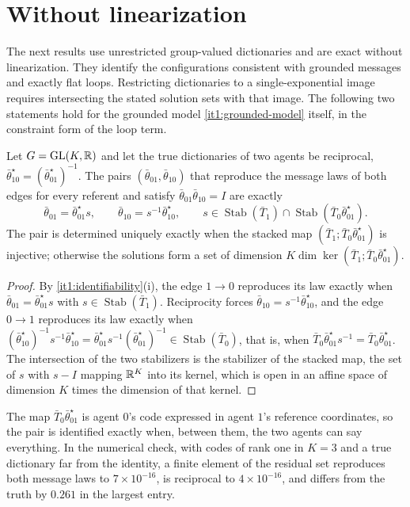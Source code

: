 \documentclass[11pt,letterpaper]{report}
\newcommand{\Stab}{\operatorname{Stab}}
\begin{document}
\section{Without linearization}

The next results use unrestricted group-valued dictionaries and are exact without linearization. They identify the configurations consistent with grounded messages and exactly flat loops. Restricting dictionaries to a single-exponential image requires intersecting the stated solution sets with that image. The following two statements hold for the grounded model \cref{it1:grounded-model} itself, in the constraint form of the loop term.

Let $G=\mathrm{GL}(K,\mathbb R)$ and let the true dictionaries of two agents be reciprocal, $\bar\theta^\star_{10}=(\bar\theta^\star_{01})^{-1}$. The pairs $(\bar\theta_{01},\bar\theta_{10})$ that reproduce the message laws of both edges for every referent and satisfy $\bar\theta_{01}\bar\theta_{10}=I$ are exactly
\begin{equation}
\bar\theta_{01}=\bar\theta^\star_{01}s,\qquad\bar\theta_{10}=s^{-1}\bar\theta^\star_{10},\qquad
s\in\Stab(\bar T_1)\cap\Stab(\bar T_0\bar\theta^\star_{01}).
\label{it1:exact-pair-eq}
\end{equation}
The pair is determined uniquely exactly when the stacked map $(\bar T_1;\bar T_0\bar\theta^\star_{01})$ is injective; otherwise the solutions form a set of dimension $K\dim\ker(\bar T_1;\bar T_0\bar\theta^\star_{01})$.
\begin{proof}
By \cref{it1:identifiability}(i), the edge $1\to0$ reproduces its law exactly when $\bar\theta_{01}=\bar\theta^\star_{01}s$ with $s\in\Stab(\bar T_1)$. Reciprocity forces $\bar\theta_{10}=s^{-1}\bar\theta^\star_{10}$, and the edge $0\to1$ reproduces its law exactly when $(\bar\theta^\star_{10})^{-1}s^{-1}\bar\theta^\star_{10}=\bar\theta^\star_{01}s^{-1}(\bar\theta^\star_{01})^{-1}\in\Stab(\bar T_0)$, that is, when $\bar T_0\bar\theta^\star_{01}s^{-1}=\bar T_0\bar\theta^\star_{01}$. The intersection of the two stabilizers is the stabilizer of the stacked map, the set of $s$ with $s-I$ mapping $\mathbb R^K$ into its kernel, which is open in an affine space of dimension $K$ times the dimension of that kernel.
\end{proof}

The map $\bar T_0\bar\theta^\star_{01}$ is agent $0$'s code expressed in agent $1$'s reference coordinates, so the pair is identified exactly when, between them, the two agents can say everything. In the numerical check, with codes of rank one in $K=3$ and a true dictionary far from the identity, a finite element of the residual set reproduces both message laws to $7\times10^{-16}$, is reciprocal to $4\times10^{-16}$, and differs from the truth by $0.261$ in the largest entry.
\end{document}
